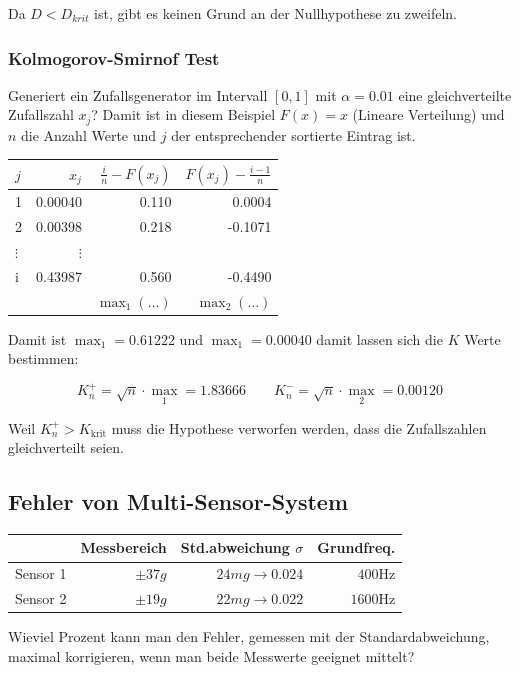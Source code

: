 Da $D < D_{krit}$ ist, gibt es keinen Grund an der Nullhypothese zu zweifeln.

\subsubsection{Kolmogorov-Smirnof Test}\label{Kolmogorov}
Generiert ein Zufallsgenerator im Intervall $[0, 1]$ mit $\alpha=0.01$ eine gleichverteilte Zufallszahl $x_j$? Damit ist in diesem Beispiel $F(x) = x$ (Lineare Verteilung) und $n$ die Anzahl Werte und $j$ der entsprechender sortierte Eintrag ist.
\begin{center}
	\begin{tabular}{l|r|r|r}
		$j$ & $x_j$ & $\frac{i}{n}-F(x_j)$ & $F(x_j) - \frac{i-1}{n}$ \\ \toprule
		1 & 0.00040 & 0.110 & 0.0004  \\  \midrule
		2& 0.00398 & 0.218 & -0.1071 \\  \midrule
		$\vdots$ & $\vdots$& &  \\  \midrule
		i & 0.43987 & 0.560 &-0.4490 \\ \bottomrule
		& & $\max_1(\dots)$ & $\max_2(\dots)$
	\end{tabular}
\end{center}

Damit ist $\max_1 = 0.61222$ und  $\max_1 = 0.00040$ damit lassen sich die $K$ Werte bestimmen:

\[
K_n^+ = \sqrt{n}\cdot \max_1 = 1.83666 \qquad K_n^- = \sqrt{n}\cdot \max_2 = 0.00120
\]

Weil $K_n^+ > K_\text{krit}$ muss die Hypothese verworfen werden, dass die Zufallszahlen gleichverteilt seien.


\subsection{Fehler von Multi-Sensor-System}
\begin{center}
	\begin{tabular}{l|r|r|r}
		& Messbereich & Std.abweichung $\sigma$ & Grundfreq. \\ \toprule
		Sensor 1 & $\pm37g$ & $24mg \rightarrow 0.024$ & $400$Hz  \\  \midrule
		Sensor 2 & $\pm19g$ & $22mg \rightarrow 0.022$ & $1600$Hz \\  \midrule
	\end{tabular}
\end{center}
Wieviel Prozent kann man den Fehler, gemessen mit der Standardabweichung, maximal korrigieren, wenn man beide Messwerte geeignet mittelt?

